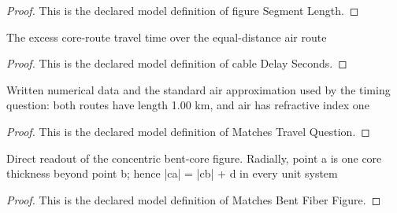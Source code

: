 \begin{proof}
  This is the declared model definition of figure Segment Length.
\end{proof}
\begin{definition}
  \label{def:physics:phyx-mini-0107:phyxminiproblems-problemphyxmini0107-cabledelayseconds}
  The excess core-route travel time over the equal-distance air route
\end{definition}
\begin{proof}
  This is the declared model definition of cable Delay Seconds.
\end{proof}
\begin{definition}
  \label{def:physics:phyx-mini-0107:phyxminiproblems-problemphyxmini0107-matchestravelquestion}
  Written numerical data and the standard air approximation used by the timing question: both routes have length 1.00 km, and air has refractive index one
\end{definition}
\begin{proof}
  This is the declared model definition of Matches Travel Question.
\end{proof}
\begin{definition}
  \label{def:physics:phyx-mini-0107:phyxminiproblems-problemphyxmini0107-matchesbentfiberfigure}
  Direct readout of the concentric bent-core figure. Radially, point a is one core thickness beyond point b; hence |ca| = |cb| + d in every unit system
\end{definition}
\begin{proof}
  This is the declared model definition of Matches Bent Fiber Figure.
\end{proof}
